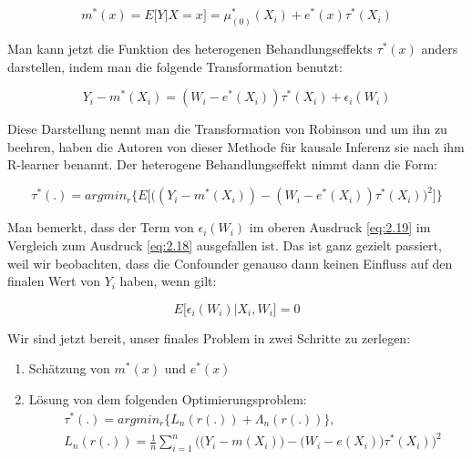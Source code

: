 \documentclass[12pt,a4paper,twoside]{scrartcl}
\numberwithin{equation}{section}
\begin{document}
\begin{equation}\label{eq:2.17}
  m^*(x) = E \big [Y |X=x \big ] =  \mu^*_{(0)}(X_i) + e^*(x)\tau^*(X_i) 
\end{equation}

\noindent
Man kann jetzt die Funktion des heterogenen Behandlungseffekts $\tau^*(x)$ anders darstellen, indem man die folgende Transformation benutzt:\par

\begin{equation}\label{eq:2.18}
 Y_i - m^*(X_i) = (W_i - e^*(X_i))\tau^*(X_i) + \epsilon_i(W_i) 
\end{equation}

\noindent
Diese Darstellung nennt man die Transformation von Robinson\cite{robinson1988root} und um ihn zu beehren, haben die Autoren von dieser Methode für kausale Inferenz sie nach ihm R-learner benannt. Der heterogene Behandlungseffekt nimmt dann die Form:\par 

\begin{equation}\label{eq:2.19}
 \tau^*(.) = argmin_r \bigg\{ E \bigg[ \bigg( ( Y_i - m^*(X_i)) - (W_i - e^*(X_i)) \tau^*(X_i)  \bigg)^2 \bigg] \bigg\}
\end{equation}

\noindent
Man bemerkt, dass der Term von $\epsilon_i(W_i)$ im oberen Ausdruck \ref{eq:2.19} im Vergleich zum Ausdruck \ref{eq:2.18} ausgefallen ist. Das ist ganz gezielt passiert, weil wir beobachten, dass die Confounder genauso dann keinen Einfluss auf den finalen Wert von $Y_i$ haben, wenn gilt:\par

\begin{equation}\label{eq:2.20}
	 E\big[\epsilon_i(W_i)|X_i,W_i\big] = 0
\end{equation}

\noindent
Wir sind jetzt bereit, unser finales Problem in zwei Schritte zu zerlegen:\par

\begin{enumerate}
  \item Schätzung von $m^*(x)$ und $e^*(x)$ 
  \item Lösung von dem folgenden Optimierungsproblem: 
  \begin{equation}\label{eq:2.21}
  \begin{split}
  	& \tau^*(.) = argmin_r \big\{ L_n(r(.))+ \Lambda_n(r(.)) \big\},\\
    &  L_n(r(.)) = \frac{1}{n}\sum_{i=1}^{n} \big( \big( Y_i - m(X_i)\big) - \big(W_i - e(X_i)\big) \tau^*(X_i)  \big)^2	
  \end{split}
  	\end{equation}
\end{enumerate}
\end{document}
